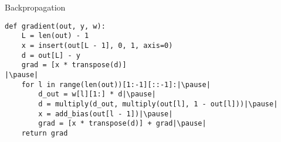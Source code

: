 \begin{frame}[fragile]
  \begin{block}{Backpropagation}
    \begin{lstlisting}
def gradient(out, y, w):
    L = len(out) - 1
    x = insert(out[L - 1], 0, 1, axis=0)
    d = out[L] - y
    grad = [x * transpose(d)]
|\pause|
    for l in range(len(out))[1:-1][::-1]:|\pause|
        d_out = w[l][1:] * d|\pause|
        d = multiply(d_out, multiply(out[l], 1 - out[l]))|\pause|
        x = add_bias(out[l - 1])|\pause|
        grad = [x * transpose(d)] + grad|\pause|
    return grad
    \end{lstlisting}
  \end{block}
\end{frame}
